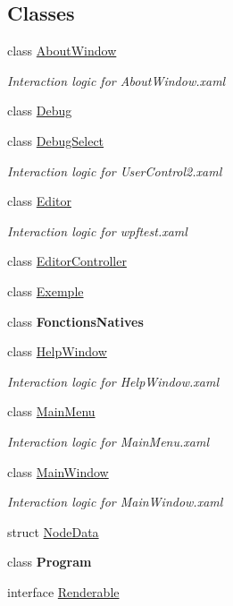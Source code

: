 \subsection*{Classes}
\begin{DoxyCompactItemize}
\item 
class \hyperlink{class_interface_graphique_1_1_about_window}{About\+Window}
\begin{DoxyCompactList}\small\item\em Interaction logic for About\+Window.\+xaml \end{DoxyCompactList}\item 
class \hyperlink{class_interface_graphique_1_1_debug}{Debug}
\item 
class \hyperlink{class_interface_graphique_1_1_debug_select}{Debug\+Select}
\begin{DoxyCompactList}\small\item\em Interaction logic for User\+Control2.\+xaml \end{DoxyCompactList}\item 
class \hyperlink{class_interface_graphique_1_1_editor}{Editor}
\begin{DoxyCompactList}\small\item\em Interaction logic for wpftest.\+xaml \end{DoxyCompactList}\item 
class \hyperlink{class_interface_graphique_1_1_editor_controller}{Editor\+Controller}
\item 
class \hyperlink{class_interface_graphique_1_1_exemple}{Exemple}
\item 
class {\bfseries Fonctions\+Natives}
\item 
class \hyperlink{class_interface_graphique_1_1_help_window}{Help\+Window}
\begin{DoxyCompactList}\small\item\em Interaction logic for Help\+Window.\+xaml \end{DoxyCompactList}\item 
class \hyperlink{class_interface_graphique_1_1_main_menu}{Main\+Menu}
\begin{DoxyCompactList}\small\item\em Interaction logic for Main\+Menu.\+xaml \end{DoxyCompactList}\item 
class \hyperlink{class_interface_graphique_1_1_main_window}{Main\+Window}
\begin{DoxyCompactList}\small\item\em Interaction logic for Main\+Window.\+xaml \end{DoxyCompactList}\item 
struct \hyperlink{struct_interface_graphique_1_1_node_data}{Node\+Data}
\item 
class {\bfseries Program}
\item 
interface \hyperlink{interface_interface_graphique_1_1_renderable}{Renderable}
\end{DoxyCompactItemize}
